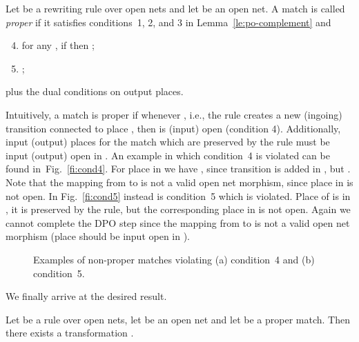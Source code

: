 \documentclass{LMCS}
\begin{document}
\begin{defi}
  \label{de:proper-match}
  Let  be a rewriting rule over open nets and let  be an open
  net. A match  is called \emph{proper} if it satisfies
  conditions~1, 2, and 3 in Lemma~\ref{le:po-complement} and 

  \begin{enumerate}[(1)]
    \setcounter{enumi}{3}

  \item for any ,  if  then ;
    
  \item 
    ;
    
  \end{enumerate}
  plus the dual conditions on output places.
\end{defi}
Intuitively, a match is proper if whenever ,
i.e., the rule  creates a new (ingoing) transition connected to
place , then  is (input) open (condition 4). Additionally,
input (output) places for the match which are preserved by the rule
must be input (output) open in .
An example in which condition~4 is violated can be found in~Fig.~\ref{fi:cond4}.
For place  in  we have , since transition  is added in , but . Note that the mapping from  to  is not a valid open net morphism, since place  in  is not open.
In Fig.~\ref{fi:cond5} instead is condition~5 which is violated. Place
 of  is in , it is preserved by the rule, but the
corresponding place in  is not open. Again we cannot complete the
DPO step since the mapping from  to  is not a valid open net
morphism (place  should be input open in ).


\begin{figure}
  \hspace{1mm}
  
  \caption{Examples of non-proper matches violating (a) condition~4 
    and (b) condition~5.}

\end{figure}

We finally arrive at the desired result.

\begin{lem}
  \label{le:general-transformation}
  Let  be a rule over open nets, let  be an open net and
  let  be a proper match.
  Then there exists a transformation .
\end{lem}
\end{document}
